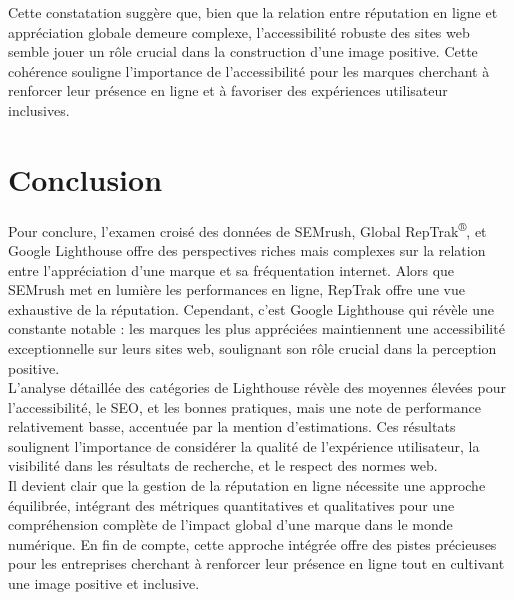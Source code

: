 \documentclass[12pt, a4paper]{report}
\begin{document}
Cette constatation suggère que, bien que la relation entre réputation en ligne et appréciation globale demeure complexe, l'accessibilité robuste des sites web semble jouer un rôle crucial dans la construction d'une image positive. Cette cohérence souligne l'importance de l'accessibilité pour les marques cherchant à renforcer leur présence en ligne et à favoriser des expériences utilisateur inclusives.

\section{Conclusion}

Pour conclure, l'examen croisé des données de SEMrush, Global RepTrak\textsuperscript{\tiny{®}}, et Google Lighthouse offre des perspectives riches mais complexes sur la relation entre l'appréciation d'une marque et sa fréquentation internet. Alors que SEMrush met en lumière les performances en ligne, RepTrak offre une vue exhaustive de la réputation. Cependant, c'est Google Lighthouse qui révèle une constante notable : les marques les plus appréciées maintiennent une accessibilité exceptionnelle sur leurs sites web, soulignant son rôle crucial dans la perception positive.\\

L'analyse détaillée des catégories de Lighthouse révèle des moyennes élevées pour l'accessibilité, le SEO, et les bonnes pratiques, mais une note de performance relativement basse, accentuée par la mention d'estimations. Ces résultats soulignent l'importance de considérer la qualité de l'expérience utilisateur, la visibilité dans les résultats de recherche, et le respect des normes web.\\

Il devient clair que la gestion de la réputation en ligne nécessite une approche équilibrée, intégrant des métriques quantitatives et qualitatives pour une compréhension complète de l'impact global d'une marque dans le monde numérique. En fin de compte, cette approche intégrée offre des pistes précieuses pour les entreprises cherchant à renforcer leur présence en ligne tout en cultivant une image positive et inclusive.

\nocite{*}
\printbibliography[heading=bibintoc,title=Bibliographie]
\end{document}
